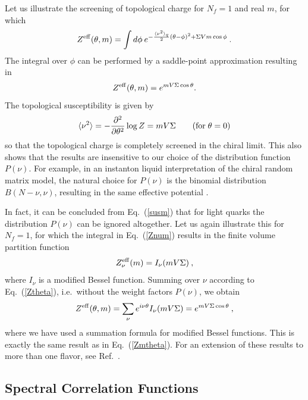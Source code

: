 Let us illustrate the screening of topological charge for $N_f = 1$
and real $m$, for which
\begin{equation}
  Z^{\rm eff}(\theta,m) = \int d \phi \: e^{-\frac{\langle \nu^2 \rangle_q}2
    (\theta -\phi )^2 + \Sigma Vm \cos \phi}\:.
\end{equation}
The integral over $\phi$ can be performed by a saddle-point
approximation resulting in \cite{Leut92}
\begin{equation}
  \label{Zmtheta}
  Z^{\rm eff}(\theta,m) = e^{mV\Sigma \cos\theta}.
\end{equation}
The topological susceptibility is given by
\begin{equation}
  \langle \nu^2\rangle = -\frac{\partial^2}{\partial{\theta^2}}
  \log Z =  m V\Sigma \qquad ({\rm for}\;\theta=0)
  \label{susm}
\end{equation}
so that the topological charge is completely screened in the chiral
limit.  This also shows that the results are insensitive to our choice
of the distribution function $P(\nu)$.  For example, in an instanton
liquid interpretation of the chiral random matrix model, the natural
choice for $P(\nu)$ is the binomial distribution $B(N-\nu,\nu)$,
resulting in the same effective potential \cite{Shur93}.

In fact, it can be concluded from Eq.~(\ref{susm}) that for light
quarks the distribution $P(\nu)$ can be ignored altogether. Let us
again illustrate this for $N_f =1$, for which the integral in
Eq.~(\ref{Znum}) results in the finite volume partition function
\begin{equation}
  Z^{\rm eff}_\nu(m) = I_\nu(mV\Sigma)\:,
\end{equation}
where $I_\nu$ is a modified Bessel function.  Summing over $\nu$ according
to Eq.~(\ref{Ztheta}), i.e.\ without the weight factors $P(\nu)$, we
obtain \cite{Damtop}
\begin{equation}
  Z^{\rm eff}(\theta, m) =\sum_{\nu}
  e^{i\nu \theta} I_\nu(mV\Sigma) = e^{mV \Sigma \cos \theta}\:,
\end{equation}
where we have used a summation formula for modified Bessel functions.
This is exactly the same result as in Eq.~(\ref{Zmtheta}). For an
extension of these results to more than one flavor, see
Ref.~\cite{Damtop}. 



\subsection{Spectral Correlation Functions}
\label{sec3.1}


